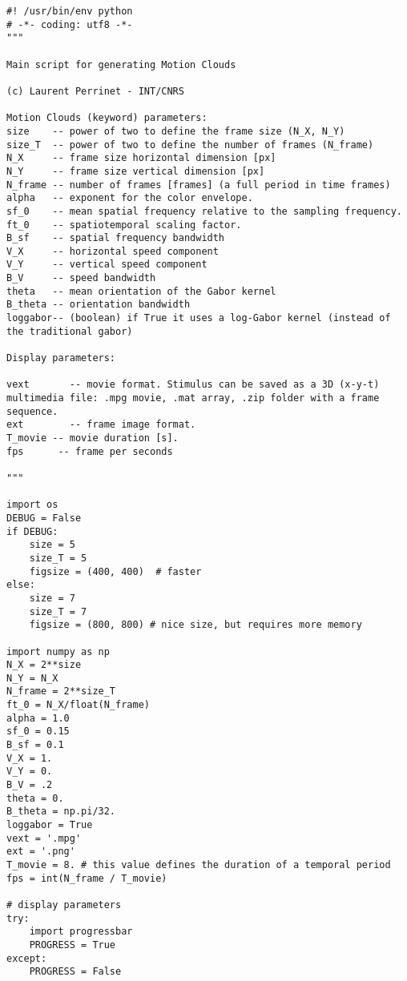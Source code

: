 \documentclass[a4paper,11pt]{article}%
\begin{document}
\begin{lstlisting}
#! /usr/bin/env python
# -*- coding: utf8 -*-
"""

Main script for generating Motion Clouds

(c) Laurent Perrinet - INT/CNRS

Motion Clouds (keyword) parameters:
size    -- power of two to define the frame size (N_X, N_Y)
size_T  -- power of two to define the number of frames (N_frame)
N_X     -- frame size horizontal dimension [px]
N_Y     -- frame size vertical dimension [px]
N_frame -- number of frames [frames] (a full period in time frames)
alpha   -- exponent for the color envelope.
sf_0    -- mean spatial frequency relative to the sampling frequency.
ft_0    -- spatiotemporal scaling factor. 
B_sf    -- spatial frequency bandwidth
V_X     -- horizontal speed component
V_Y     -- vertical speed component
B_V     -- speed bandwidth
theta   -- mean orientation of the Gabor kernel
B_theta -- orientation bandwidth
loggabor-- (boolean) if True it uses a log-Gabor kernel (instead of the traditional gabor) 

Display parameters:

vext       -- movie format. Stimulus can be saved as a 3D (x-y-t) multimedia file: .mpg movie, .mat array, .zip folder with a frame sequence.     
ext        -- frame image format.
T_movie -- movie duration [s].
fps      -- frame per seconds

"""

import os
DEBUG = False
if DEBUG:
    size = 5
    size_T = 5
    figsize = (400, 400)  # faster
else:
    size = 7
    size_T = 7
    figsize = (800, 800) # nice size, but requires more memory

import numpy as np
N_X = 2**size
N_Y = N_X
N_frame = 2**size_T
ft_0 = N_X/float(N_frame)
alpha = 1.0
sf_0 = 0.15
B_sf = 0.1
V_X = 1.
V_Y = 0.
B_V = .2
theta = 0.
B_theta = np.pi/32.
loggabor = True
vext = '.mpg'
ext = '.png'
T_movie = 8. # this value defines the duration of a temporal period
fps = int(N_frame / T_movie)

# display parameters
try:
    import progressbar
    PROGRESS = True
except:
    PROGRESS = False


\end{lstlisting}
\end{document}
